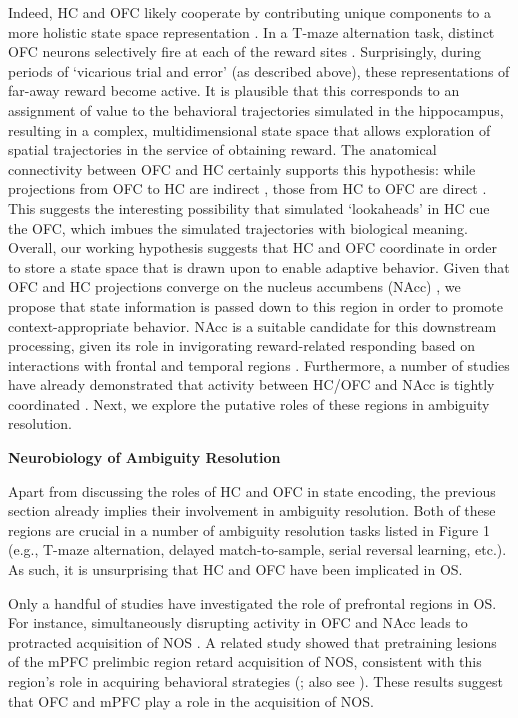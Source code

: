 \documentclass[11pt]{article}
\let\cite=\citep
\let\citeNP=\citealt
\begin{document}
Indeed, HC and OFC likely cooperate by contributing unique components to a more 
holistic state space representation \cite{Wikenheiser2016}. In a T-maze 
alternation task, distinct OFC neurons selectively fire at each of the reward 
sites \cite{Steiner2012}. Surprisingly, during periods of `vicarious trial and 
error' (as described above), these representations of far-away reward become 
active. It is plausible that this corresponds to an assignment of value to the 
behavioral trajectories simulated in the hippocampus, resulting in a complex, 
multidimensional state space that allows exploration of spatial trajectories in 
the service of obtaining reward. The anatomical connectivity between OFC and HC 
certainly supports this hypothesis: while projections from OFC to HC are 
indirect \cite{Prasad2013}, those from HC to OFC are direct 
\cite{Jay1991,Barbas1995}. This suggests the interesting possibility that 
simulated `lookaheads' in HC cue the OFC, which imbues the simulated 
trajectories with biological meaning. Overall, our working hypothesis suggests 
that HC and OFC coordinate in order to store a state space that is drawn upon 
to enable adaptive behavior. Given that OFC and HC projections converge on the 
nucleus accumbens (NAcc) \cite{Mogenson1980}, we propose that state information 
is passed down to this region in order to promote context-appropriate behavior. 
NAcc is a suitable candidate for this downstream processing, given its role in 
invigorating reward-related responding based on interactions with frontal and 
temporal regions \cite{Floresco2015}. Furthermore, a number of studies have 
already demonstrated that activity between HC/OFC and NAcc is tightly 
coordinated \cite{Cooch2015,VanderMeer2011}. Next, we explore the putative 
roles of these regions in ambiguity resolution.

{\bf Neurobiology of Ambiguity Resolution}

Apart from discussing the roles of HC and OFC in state encoding, the previous 
section already implies their involvement in ambiguity resolution. Both of 
these regions are crucial in a number of ambiguity resolution tasks listed in 
Figure 1 (e.g., T-maze alternation, delayed match-to-sample, serial reversal 
learning, etc.). As such, it is unsurprising that HC and OFC have been 
implicated in OS.  

Only a handful of studies have investigated the role of prefrontal regions in 
OS. For instance, simultaneously disrupting activity in OFC and NAcc leads to 
protracted acquisition of NOS \cite{Meyer2016}. A related study showed that 
pretraining lesions of the mPFC prelimbic region retard acquisition of NOS, 
consistent with this region's role in acquiring behavioral strategies 
(\citeNP{MacLeod2010}; also see \citeNP{Meyer2014}). These results suggest 
that OFC and mPFC play a role in the acquisition of NOS.
\end{document}
